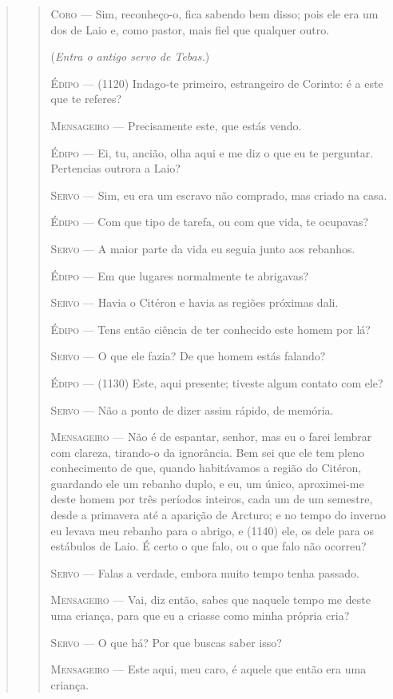 \begin{verse}
\begin{verse}
\textsc{Coro} --- Sim, reconheço-o, fica sabendo bem disso; pois ele era um dos de Laio e,
como pastor, mais fiel que qualquer outro.

(\emph{Entra o antigo servo de Tebas.})

\textsc{Édipo} --- (1120) Indago-te primeiro, estrangeiro de Corinto: é a este que te
referes?

\textsc{Mensageiro} --- Precisamente este, que estás vendo.

\textsc{Édipo} --- Ei, tu, ancião, olha aqui e me diz o que eu te perguntar. Pertencias
outrora a Laio?

\textsc{Servo} --- Sim, eu era um escravo não comprado, mas criado na casa.

\textsc{Édipo} --- Com que tipo de tarefa, ou com que vida, te ocupavas?

\textsc{Servo} --- A maior parte da vida eu seguia junto aos rebanhos.

\textsc{Édipo} --- Em que lugares normalmente te abrigavas?

\textsc{Servo} --- Havia o Citéron e havia as regiões próximas dali.

\textsc{Édipo} --- Tens então ciência de ter conhecido este homem por lá?

\textsc{Servo} --- O que ele fazia? De que homem estás falando?

\textsc{Édipo} --- (1130) Este, aqui presente; tiveste algum contato com ele?

\textsc{Servo} --- Não a ponto de dizer assim rápido, de memória.

\textsc{Mensageiro} --- Não é de espantar, senhor, mas eu o farei lembrar com clareza, tirando-o
da ignorância. Bem sei que ele tem pleno conhecimento de que, quando
habitávamos a região do Citéron, guardando ele um rebanho duplo, e eu,
um único, aproximei-me deste homem por três períodos inteiros, cada um
de um semestre, desde a primavera até a aparição de Arcturo; e no tempo
do inverno eu levava meu rebanho para o abrigo, e (1140) ele, os dele
para os estábulos de Laio. É certo o que falo, ou o que falo não
ocorreu?

\textsc{Servo} --- Falas a verdade, embora muito tempo tenha passado.

\textsc{Mensageiro} --- Vai, diz então, sabes que naquele tempo me deste uma criança, para que
eu a criasse como minha própria cria?

\textsc{Servo} --- O que há? Por que buscas saber isso?

\textsc{Mensageiro} --- Este aqui, meu caro, é aquele que então era uma criança.


\end{verse}
\end{verse}
